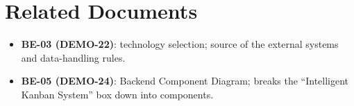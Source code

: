 \documentclass[11pt,a4paper]{article}
\begin{document}
\section{Related Documents}

\begin{itemize}
  \item \textbf{BE-03 (DEMO-22)}: technology selection; source of the external systems and data-handling rules.
  \item \textbf{BE-05 (DEMO-24)}: Backend Component Diagram; breaks the ``Intelligent Kanban System'' box down into components.
\end{itemize}
\end{document}
